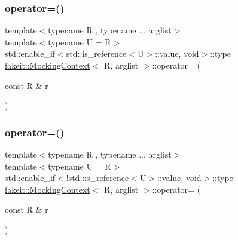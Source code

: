 \subsubsection{\texorpdfstring{operator=()}{operator=()}\hspace{0.1cm}{\footnotesize\ttfamily [8/27]}}
{\footnotesize\ttfamily template$<$typename R , typename ... arglist$>$ \\
template$<$typename U  = R$>$ \\
std\+::enable\+\_\+if$<$std\+::is\+\_\+reference$<$U$>$\+::value, void$>$\+::type \mbox{\hyperlink{classfakeit_1_1MockingContext}{fakeit\+::\+Mocking\+Context}}$<$ R, arglist $>$\+::operator= (\begin{DoxyParamCaption}\item[{const R \&}]{r }\end{DoxyParamCaption})\hspace{0.3cm}{\ttfamily [inline]}}

\mbox{\label{classfakeit_1_1MockingContext_adfac3df2408adaa86efec81bd5533a6d}} 
\subsubsection{\texorpdfstring{operator=()}{operator=()}\hspace{0.1cm}{\footnotesize\ttfamily [9/27]}}
{\footnotesize\ttfamily template$<$typename R , typename ... arglist$>$ \\
template$<$typename U  = R$>$ \\
std\+::enable\+\_\+if$<$!std\+::is\+\_\+reference$<$U$>$\+::value, void$>$\+::type \mbox{\hyperlink{classfakeit_1_1MockingContext}{fakeit\+::\+Mocking\+Context}}$<$ R, arglist $>$\+::operator= (\begin{DoxyParamCaption}\item[{const R \&}]{r }\end{DoxyParamCaption})\hspace{0.3cm}{\ttfamily [inline]}}

\mbox{\label{classfakeit_1_1MockingContext_adfac3df2408adaa86efec81bd5533a6d}} 
